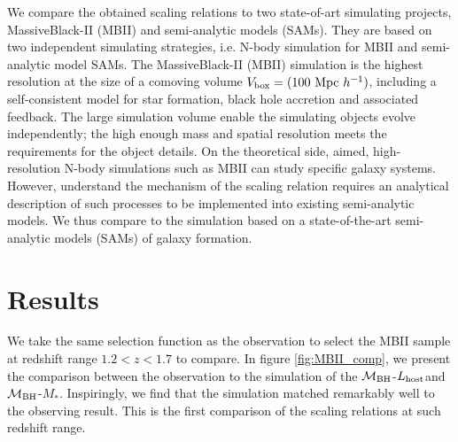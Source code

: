 \documentclass{natureprintstyle}
\newcommand{\mbh}{$\mathcal M_{\rm BH}$}
\newcommand{\lhost}{$L_{\rm host}$}
\newcommand{\mstar}{{$M_*$}}
\begin{document}
We compare the obtained scaling relations to two state-of-art simulating projects, MassiveBlack-II (MBII) and semi-analytic models (SAMs). They are based on two independent simulating strategies, i.e. N-body simulation for MBII and semi-analytic model SAMs. The MassiveBlack-II (MBII) simulation is the highest resolution at the size of a comoving volume $V_{\rm box} = (100~{\rm Mpc}~h^{-1})$, including a self-consistent model for star formation, black hole accretion and associated feedback. The large simulation volume enable the simulating objects evolve independently; the high enough mass and spatial resolution meets the requirements for the object details.  On the theoretical side, aimed, high-resolution N-body simulations such as MBII can study specific galaxy systems. However, understand the mechanism of the scaling relation requires an analytical description of such processes to be implemented into existing semi-analytic models. We thus compare to the simulation based on a state-of-the-art semi-analytic models (SAMs) of galaxy formation.

\section{Results}
We take the same selection function as the observation to select the MBII sample at redshift range  $1.2 < z < 1.7$ to compare. 
In figure \ref{fig:MBII_comp}, we present the comparison between the observation to the simulation of the \mbh-\lhost and \mbh-\mstar. 
Inspiringly, we find that the simulation matched remarkably well to the observing result. This is the first comparison of the scaling relations at such redshift range.
\end{document}
